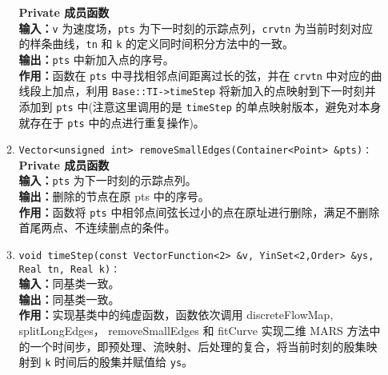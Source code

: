 \documentclass[a4paper,twoside]{ctexart}
\begin{document}
\begin{itemize}
\begin{enumerate}[(1)]
                \textbf{Private 成员函数}\\
                \textbf{输入：}\texttt{v} 为速度场，\texttt{pts} 为下一时刻的示踪点列，\texttt{crvtn} 为当前时刻对应的样条曲线，\texttt{tn} 和 \texttt{k} 的定义同时间积分方法中的一致。\\
                \textbf{输出：}\texttt{pts} 中新加入点的序号。\\
                \textbf{作用：}函数在 \texttt{pts} 中寻找相邻点间距离过长的弦，并在 \texttt{crvtn} 中对应的曲线段上加点，利用 \texttt{Base::TI->timeStep} 将新加入的点映射到下一时刻并添加到 \texttt{pts} 中(注意这里调用的是 \texttt{timeStep} 的单点映射版本，避免对本身就存在于 \texttt{pts} 中的点进行重复操作)。
                \item \texttt{Vector<unsigned int> removeSmallEdges({\color{blue}Container<Point> \&pts})：}\\
                \textbf{Private 成员函数}\\
                \textbf{输入：}\texttt{pts} 为下一时刻的示踪点列。\\%
                \textbf{输出：}删除的节点在原 pts 中的序号。\\%
                \textbf{作用：}函数将 \texttt{pts} 中相邻点间弦长过小的点在原址进行删除，满足不删除首尾两点、不连续删点的条件。
                \item \texttt{void timeStep(const VectorFunction<2> \&v, YinSet<2,Order> \&ys, Real tn, Real k)：}\\
                \textbf{输入：}同基类一致。\\
                \textbf{输出：}同基类一致。\\
                \textbf{作用：}实现基类中的纯虚函数，函数依次调用 discreteFlowMap, splitLongEdges， removeSmallEdges 和 fitCurve 实现二维 MARS 方法中的一个时间步，即预处理、流映射、后处理的复合，将当前时刻的殷集映射到 \texttt{k} 时间后的殷集并赋值给 \texttt{ys}。
            \end{enumerate}
          \end{itemize}




\end{document}
